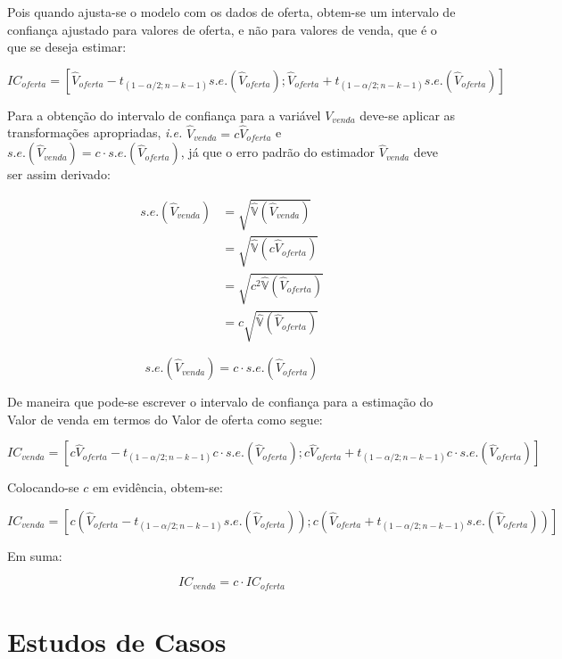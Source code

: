 \documentclass{article}
\begin{document}
Pois quando ajusta-se o modelo com os dados de oferta, obtem-se um
intervalo de confiança ajustado para valores de oferta, e não para
valores de venda, que é o que se deseja estimar:

\begin{equation}
\label{eq:ICOferta}
IC_{oferta} = [\hat V_{oferta} - t_{(1-\alpha/2; n-k-1)} s.e.(\hat V_{oferta});
   \hat V_{oferta} + t_{(1-\alpha/2; n-k-1)} s.e.(\hat V_{oferta})]
\end{equation}

Para a obtenção do intervalo de confiança para a variável \(V_{venda}\)
deve-se aplicar as transformações apropriadas, \emph{i.e.}
\(\hat V_{venda} = c \hat V_{oferta}\) e
\(s.e.(\hat V_{venda}) = c \cdot s.e.(\hat V_{oferta})\), já que o erro
padrão do estimador \(\hat V_{venda}\) deve ser assim derivado:

\begin{align*}
s.e.(\hat V_{venda}) &= \sqrt{\hat{\mathbb{V}}(\hat V_{venda})}\\
&= \sqrt{\hat{\mathbb{V}}(c \hat V_{oferta})} \\
&= \sqrt{c^2 \hat{\mathbb{V}}(\hat V_{oferta})}\\
&= c \sqrt{\hat{\mathbb{V}}(\hat V_{oferta})}
\end{align*}

\begin{equation}
\label{eq:SEVenda}
s.e.(\hat V_{venda}) = c \cdot s.e.(\hat V_{oferta})
\end{equation}

De maneira que pode-se escrever o intervalo de confiança para a
estimação do Valor de venda em termos do Valor de oferta como segue:

\[IC_{venda} = [c \hat V_{oferta} - t_{(1-\alpha/2; n-k-1)} c \cdot s.e.(\hat V_{oferta}); 
   c \hat V_{oferta} + t_{(1-\alpha/2; n-k-1)} c \cdot s.e.(\hat V_{oferta})]\]

Colocando-se \(c\) em evidência, obtem-se:

\[IC_{venda} = [c(\hat V_{oferta} - t_{(1-\alpha/2; n-k-1)} s.e.(\hat V_{oferta})); 
   c(\hat V_{oferta} + t_{(1-\alpha/2; n-k-1)} s.e.(\hat V_{oferta}))]\]

Em suma:

\begin{equation}
\label{eq:ICVendaOferta}
IC_{venda} = c \cdot IC_{oferta}
\end{equation}

\hypertarget{estudos-de-casos}{%
\section{Estudos de Casos}\label{estudos-de-casos}}
\end{document}

